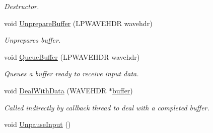 \begin{DoxyCompactItemize}
\begin{DoxyCompactList}\small\item\em Destructor. \item\end{DoxyCompactList}\item 
void \hyperlink{class_sound_input_instance_a30475b19bcb643c33547a68b434410f6}{UnprepareBuffer} (LPWAVEHDR wavehdr)
\begin{DoxyCompactList}\small\item\em Unprepares buffer. \item\end{DoxyCompactList}\item 
void \hyperlink{class_sound_input_instance_a2347f5dd7dfd8639dc16e99536a39c05}{QueueBuffer} (LPWAVEHDR wavehdr)
\begin{DoxyCompactList}\small\item\em Queues a buffer ready to receive input data. \item\end{DoxyCompactList}\item 
void \hyperlink{class_sound_input_instance_a0bc25bf68db3a3dc83c7addac5b164fa}{DealWithData} (WAVEHDR $\ast$\hyperlink{class_sound_input_instance_ab77e1132d51ce6cd63488d598163903f}{buffer})
\begin{DoxyCompactList}\small\item\em Called indirectly by callback thread to deal with a completed buffer. \item\end{DoxyCompactList}\item 
\hypertarget{class_sound_input_instance_a3cbe0eebc1b783866401c5b59bfbc0bc}{
void \hyperlink{class_sound_input_instance_a3cbe0eebc1b783866401c5b59bfbc0bc}{UnpauseInput} ()}
\label{class_sound_input_instance_a3cbe0eebc1b783866401c5b59bfbc0bc}


\end{DoxyCompactItemize}
